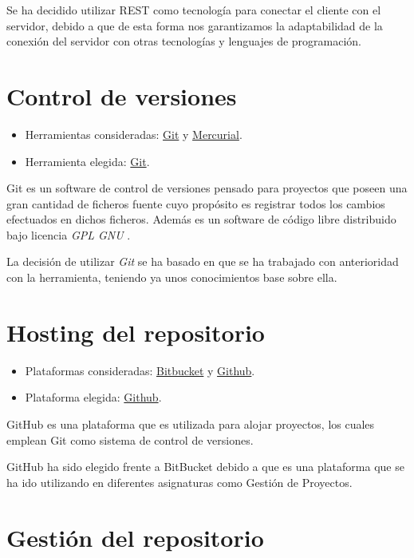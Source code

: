 Se ha decidido utilizar REST como tecnología para conectar el cliente con el servidor, debido a que de esta forma nos garantizamos la adaptabilidad de la conexión del servidor con otras tecnologías y lenguajes de programación.

\section{Control de versiones}

\begin{itemize}
	\tightlist
	\item
	Herramientas consideradas: \href{https://git-scm.com/}{Git} y \href{https://www.mercurial-scm.org/}{Mercurial}.
	\item
	Herramienta elegida: \href{https://git-scm.com/}{Git}.
\end{itemize}

Git es un software de control de versiones pensado para proyectos que poseen una gran cantidad de ficheros fuente cuyo propósito es registrar todos los cambios efectuados en dichos ficheros. Además es un software de código libre distribuido bajo licencia \textit{GPL GNU} \cite{git:wiki}.

La decisión de utilizar \textit{Git} se ha basado en que se ha trabajado con anterioridad con la herramienta, teniendo ya unos conocimientos base sobre ella.

\section{Hosting del repositorio}

\begin{itemize}
	\tightlist
	\item
	Plataformas consideradas: \href{https://bitbucket.org/}{Bitbucket} y \href{https://github.com/}{Github}.
	\item
	Plataforma elegida: \href{https://github.com/}{Github}.
\end{itemize}

GitHub es una plataforma que es utilizada para alojar proyectos, los cuales emplean Git como sistema de control de versiones.

GitHub ha sido elegido frente a BitBucket debido a que es una plataforma que se ha ido utilizando en diferentes asignaturas como Gestión de Proyectos.

\section{Gestión del repositorio}

